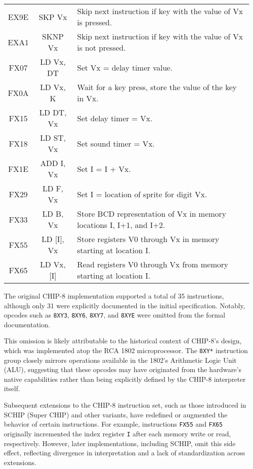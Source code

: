 \begin{longtable}{|c|c|p{9cm}|}
EX9E & SKP Vx & Skip next instruction if key with the value of Vx is pressed. \\
EXA1 & SKNP Vx & Skip next instruction if key with the value of Vx is not pressed. \\
FX07 & LD Vx, DT & Set Vx = delay timer value. \\
FX0A & LD Vx, K & Wait for a key press, store the value of the key in Vx. \\
FX15 & LD DT, Vx & Set delay timer = Vx. \\
FX18 & LD ST, Vx & Set sound timer = Vx. \\
FX1E & ADD I, Vx & Set I = I + Vx. \\
FX29 & LD F, Vx & Set I = location of sprite for digit Vx. \\
FX33 & LD B, Vx & Store BCD representation of Vx in memory locations I, I+1, and I+2. \\
FX55 & LD [I], Vx & Store registers V0 through Vx in memory starting at location I. \\
FX65 & LD Vx, [I] & Read registers V0 through Vx from memory starting at location I. \\
\end{longtable}

\par The original CHIP-8 implementation supported a total of 35 instructions, although only 31 were explicitly documented in the initial specification. Notably, opcodes such as \texttt{8XY3}, \texttt{8XY6}, \texttt{8XY7}, and \texttt{8XYE} were omitted from the formal documentation.

\par This omission is likely attributable to the historical context of CHIP-8’s design, which was implemented atop the RCA 1802 microprocessor. The \texttt{8XY*} instruction group closely mirrors operations available in the 1802’s Arithmetic Logic Unit (ALU), suggesting that these opcodes may have originated from the hardware's native capabilities rather than being explicitly defined by the CHIP-8 interpreter itself.

\par Subsequent extensions to the CHIP-8 instruction set, such as those introduced in SCHIP (Super CHIP) and other variants, have redefined or augmented the behavior of certain instructions. For example, instructions \texttt{FX55} and \texttt{FX65} originally incremented the index register \texttt{I} after each memory write or read, respectively. However, later implementations, including SCHIP, omit this side effect, reflecting divergence in interpretation and a lack of standardization across extensions.

